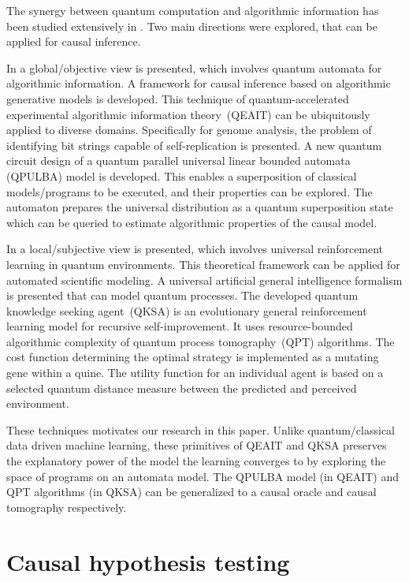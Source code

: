 \documentclass[%
 aps,
 jmp,%
 amsmath,amssymb,
 reprint,%
]{revtex4-2}
\begin{document}
The synergy between quantum computation and algorithmic information has been studied extensively in \cite{sarkar2022applications}.
Two main directions were explored, that can be applied for causal inference.

In \cite{sarkar2021estimating} a global/objective view is presented, which involves quantum automata for algorithmic information.
A framework for causal inference based on algorithmic generative models is developed. 
This technique of quantum-accelerated experimental algorithmic information theory~(QEAIT) can be ubiquitously applied to diverse domains. 
Specifically for genome analysis, the problem of identifying bit strings capable of self-replication is presented. 
A new quantum circuit design of a quantum parallel universal linear bounded automata (QPULBA) model is developed.
This enables a superposition of classical models/programs to be executed, and their properties can be explored. 
The automaton prepares the universal distribution as a quantum superposition state which can be queried to estimate algorithmic properties of the causal model.

In \cite{sarkar2021qksa} a local/subjective view is presented, which involves universal reinforcement learning in quantum environments.
This theoretical framework can be applied for automated scientific modeling. 
A universal artificial general intelligence formalism is presented that can model quantum processes. 
The developed quantum knowledge seeking agent~(QKSA) is an evolutionary general reinforcement learning model for recursive self-improvement. 
It uses resource-bounded algorithmic complexity of quantum process tomography~(QPT) algorithms. 
The cost function determining the optimal strategy is implemented as a mutating gene within a quine. 
The utility function for an individual agent is based on a selected quantum distance measure between the predicted and perceived environment.

These techniques motivates our research in this paper.
Unlike quantum/classical data driven machine learning, these primitives of QEAIT and QKSA preserves the explanatory power of the model the learning converges to by exploring the space of programs on an automata model.
The QPULBA model (in QEAIT) and QPT algorithms (in QKSA) can be generalized to a causal oracle and causal tomography respectively.

\section{Causal hypothesis testing} \label{sec:causal-hypothesis-testing}
\end{document}
